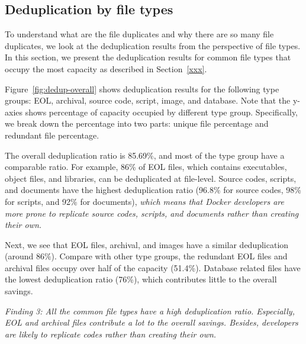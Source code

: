 \subsection{Deduplication by file types}


To understand what are the file duplicates and why there are so many file duplicates, we look at the deduplication results from the perspective of file types. In this section, we present the deduplication results for common file types that occupy the most capacity as described in Section~\ref{xxx}.

Figure~\ref{fig:dedup-overall} shows deduplication results for 
the following type groups: EOL, archival, source code, script, image, and database. Note that the y-axies shows percentage of capacity occupied by different type group. Specifically, we break down the percentage into two parts: unique file percentage and redundant file percentage.

The overall deduplication ratio is 85.69\%, and most of the type group have a comparable ratio. For example, 86\% of EOL files, which contains executables, object files, and libraries, can be deduplicated at file-level.
Source codes, scripts, and documents have the highest deduplication ratio (96.8\% for source codes, 98\% for scripts, and 92\% for documents), \textit{which means that Docker developers are more prone to replicate source codes, scripts, and documents rather than creating their own.}

Next, we see that EOL files, archival, and images have a similar deduplication (around 86\%). Compare with other type groups, the redundant EOL files and archival files occupy over half of the capacity (51.4\%). 
Database related files have the lowest deduplication ratio (76\%), which contributes little to the overall savings.

\textit{Finding 3: All the common file types have a high deduplication ratio.
Especially,
EOL and archival files contribute a lot to the overall savings.
Besides, developers are likely to replicate codes rather than creating their own.}
 
